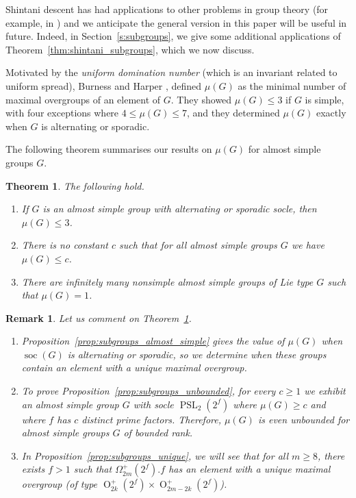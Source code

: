 \documentclass[11pt]{article}
\numberwithin{equation}{section}
\theoremstyle{shdefinition}
\newtheorem{shremark}[shdefinition]{Remark}
\theoremstyle{shplain}
\newtheorem{shtheorem}[shdefinition]{Theorem}
\newcommand{\<}{\langle}
\renewcommand{\>}{\rangle}
\renewcommand{\leq}{\leqslant}
\renewcommand{\geq}{\geqslant}
\newcommand{\soc}{\operatorname{soc}}
\renewcommand{\:}{\colon}
\newcommand{\PSL}{\operatorname{PSL}}
\newcommand{\Om}{\Omega}
\renewcommand{\O}{\operatorname{O}}
\begin{document}
Shintani descent has had applications to other problems in group theory (for example, in \cite{ref:FulmanGuralnick12,ref:GuestMorrisPraegerSpiga15}) and we anticipate the general version in this paper will be useful in future. Indeed, in Section~\ref{s:subgroups}, we give some additional applications of Theorem~\ref{thm:shintani_subgroups}, which we now discuss.

Motivated by the \emph{uniform domination number} (which is an invariant related to uniform spread), Burness and Harper \cite{ref:BurnessHarper19}, defined $\mu(G)$ as the minimal number of maximal overgroups of an element of $G$. They showed $\mu(G) \leq 3$ if $G$ is simple, with four exceptions where $4 \leq \mu(G) \leq 7$, and they determined $\mu(G)$ exactly when $G$ is alternating or sporadic.

The following theorem summarises our results on $\mu(G)$ for almost simple groups $G$.

\begin{shtheorem} \label{thm:subgroups}
The following hold.
\begin{enumerate}
\item If $G$ is an almost simple group with alternating or sporadic socle, then $\mu(G) \leq 3$.
\item There is no constant $c$ such that for all almost simple groups $G$ we have $\mu(G) \leq c$.
\item There are infinitely many nonsimple almost simple groups of Lie type $G$ such that $\mu(G) = 1$.
\end{enumerate}
\end{shtheorem}

\begin{shremark}
Let us comment on Theorem~\ref{thm:subgroups}.
\begin{enumerate}
\item Proposition~\ref{prop:subgroups_almost_simple} gives the value of $\mu(G)$ when $\soc(G)$ is alternating or sporadic, so we determine when these groups contain an element with a unique maximal overgroup.
\item To prove Proposition~\ref{prop:subgroups_unbounded}, for every $c \geq 1$ we exhibit an almost simple group $G$ with socle $\PSL_2(2^f)$ where $\mu(G) \geq c$ and where $f$ has $c$ distinct prime factors. Therefore, $\mu(G)$ is even unbounded for almost simple groups $G$ of bounded rank.
\item In Proposition~\ref{prop:subgroups_unique}, we will see that for all $m \geq 8$, there exists $f > 1$ such that $\Om^+_{2m}(2^f).f$ has an element with a unique maximal overgroup (of type $\O^+_{2k}(2^f) \times \O^+_{2m-2k}(2^f)$).
\end{enumerate}
\end{shremark}
\end{document}
